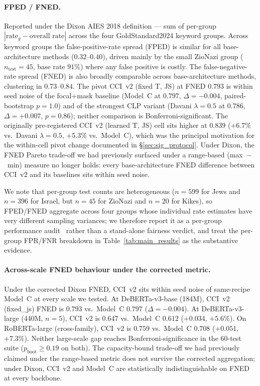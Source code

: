 \documentclass[10pt,a4paper]{article}
\begin{document}
\paragraph{FPED / FNED.}
Reported under the Dixon AIES 2018 definition --- sum of per-group $|\text{rate}_g - \text{overall rate}|$ across the four GoldStandard2024 keyword groups. Across keyword groups the false-positive-rate spread (FPED) is similar for all base-architecture methods ($0.32$--$0.40$), driven mainly by the small ZioNazi group ($n_{\text{test}} = 45$, base rate $91\%$) where any false positive is costly. The false-negative-rate spread (FNED) is also broadly comparable across base-architecture methods, clustering in $0.73$--$0.84$. The pivot CCI~v2 (fixed T, JS) at FNED $0.793$ is within seed noise of the focal+mask baseline (Model~C at $0.797$, $\Delta = -0.004$, paired-bootstrap $p = 1.0$) and of the strongest CLP variant (Davani $\lambda=0.5$ at $0.786$, $\Delta = +0.007$, $p = 0.86$); neither comparison is Bonferroni-significant. The originally pre-registered CCI~v2 (learned T, JS) cell sits higher at $0.839$ ($+6.7\%$ vs.\ Davani $\lambda=0.5$, $+5.3\%$ vs.\ Model~C), which was the principal motivation for the within-cell pivot change documented in \S\ref{sec:sig_protocol}. Under Dixon, the FNED Pareto trade-off we had previously surfaced under a range-based (max~$-$~min) measure no longer holds: every base-architecture FNED difference between CCI~v2 and its baselines sits within seed noise.

We note that per-group test counts are heterogeneous ($n=599$ for Jews and $n=396$ for Israel, but $n=45$ for ZioNazi and $n=20$ for Kikes), so FPED/FNED aggregate across four groups whose individual rate estimates have very different sampling variances; we therefore report it as a per-group performance audit~\citep{veitch2021counterfactual} rather than a stand-alone fairness verdict, and treat the per-group FPR/FNR breakdown in Table~\ref{tab:main_results} as the substantive evidence.

\paragraph{Across-scale FNED behaviour under the corrected metric.}
Under the corrected Dixon FNED, CCI~v2 sits within seed noise of same-recipe Model~C at every scale we tested. At DeBERTa-v3-base (184M), CCI~v2 (fixed\_js) FNED is $0.793$ vs.\ Model~C $0.797$ ($\Delta = -0.004$). At DeBERTa-v3-large (440M, $n=5$), CCI~v2 is $0.647$ vs.\ Model~C $0.612$ ($+0.034$, $+5.6\%$). On RoBERTa-large (cross-family), CCI~v2 is $0.759$ vs.\ Model~C $0.708$ ($+0.051$, $+7.3\%$). Neither large-scale gap reaches Bonferroni-significance in the 60-test suite ($p_{\text{boot}} \ge 0.19$ on both). The capacity-bound trade-off we had previously claimed under the range-based metric does not survive the corrected aggregation; under Dixon, CCI~v2 and Model~C are statistically indistinguishable on FNED at every backbone.
\end{document}
